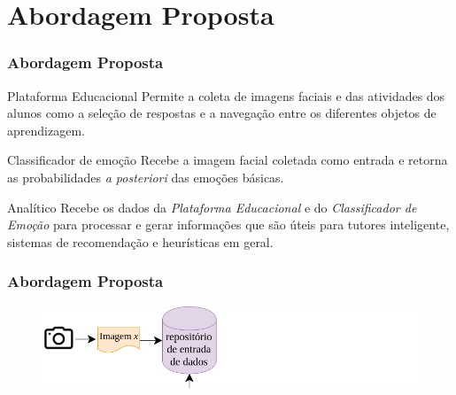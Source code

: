\documentclass{beamer}
\begin{document}
\section{Abordagem Proposta}
\begin{frame}
\frametitle{Abordagem Proposta}
\pause
\begin{block}{Plataforma Educacional}
Permite a coleta de imagens faciais e das atividades dos alunos como a sele\c{c}\~ao de 
respostas e a navega\c{c}\~ao entre os diferentes objetos de aprendizagem.
\end{block}
\pause
\begin{block}{Classificador de emo\c{c}\~ao}
Recebe a imagem facial coletada como entrada e retorna as probabilidades \textit{a posteriori} das emo\c{c}\~oes b\'asicas.
\end{block}
\pause
\begin{block}{Anal\'{i}tico}
Recebe os dados da \textit{Plataforma Educacional} e do \textit{Classificador de Emo\c{c}\~ao} para processar e gerar informa\c{c}\~oes que s\~{a}o 
\'{u}teis para tutores inteligente, sistemas de recomenda\c{c}\~ao e heur\'isticas em geral.    
\end{block}

\end{frame}


\begin{frame}
\frametitle{Abordagem Proposta}
\begin{figure}
\centering
\includegraphics[scale=0.37]{figuras/arquitetura_1.png}
\label{fig:arquitetura1}
\end{figure}
\end{frame}
\end{document}
